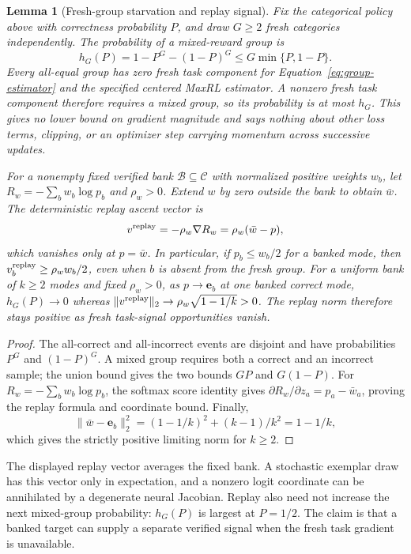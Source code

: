 \documentclass{article}
\newcommand{\1}{\mathbf 1}
\newtheorem{lemma}{Lemma}[section]
\theoremstyle{remark}
\theoremstyle{definition}
\theoremstyle{plain}
\begin{document}
\begin{lemma}[Fresh-group starvation and replay signal]
\label{lem:replay-gradient-availability}
Fix the categorical policy above with correctness probability $P$, and draw
$G\ge2$ fresh categories independently. The probability of a mixed-reward
group is
\[
 h_G(P)=1-P^G-(1-P)^G\le G\min\{P,1-P\}.
\]
Every all-equal group has zero fresh task component for
Equation~\eqref{eq:group-estimator} and the specified centered MaxRL
estimator. A nonzero fresh task component therefore requires a mixed group,
so its probability is at most $h_G$. This gives no lower bound on gradient
magnitude and says nothing about other loss terms, clipping, or an optimizer step carrying momentum across successive updates.

For a nonempty fixed verified bank $\mathcal B\subseteq\mathcal C$ with
normalized positive weights $w_b$, let
$R_w=-\sum_b w_b\log p_b$ and $\rho_w>0$. Extend $w$ by zero outside the
bank to obtain $\bar w$. The deterministic replay ascent vector is
\[
 v^{\rm replay}=-\rho_w\nabla R_w=\rho_w(\bar w-p),
\]
which vanishes only at $p=\bar w$. In particular, if $p_b\le w_b/2$ for a banked
mode, then $v^{\rm replay}_b\ge\rho_w w_b/2$, even when $b$ is absent from the
fresh group. For a uniform bank of $k\ge2$ modes and fixed $\rho_w>0$, as
$p\to\mathbf e_b$ at one banked correct mode, $h_G(P)\to0$ whereas
$\|v^{\rm replay}\|_2\to\rho_w\sqrt{1-1/k}>0$.
The replay norm therefore stays positive as fresh task-signal opportunities vanish.
\end{lemma}

\begin{proof}
The all-correct and all-incorrect events are disjoint and have probabilities
$P^G$ and $(1-P)^G$. A mixed group requires both a correct and an incorrect
sample; the union bound gives the two bounds $GP$ and $G(1-P)$.
For $R_w=-\sum_b w_b\log p_b$, the softmax score identity gives
$\partial R_w/\partial z_a=p_a-\bar w_a$, proving the replay formula and
coordinate bound. Finally,
\[
 \|\bar w-\mathbf e_b\|_2^2=(1-1/k)^2+(k-1)/k^2=1-1/k,
\]
which gives the strictly positive limiting norm for $k\ge2$.
\end{proof}


The displayed replay vector averages the fixed bank. A stochastic exemplar
draw has this vector only in expectation, and a nonzero logit coordinate can
be annihilated by a degenerate neural Jacobian. Replay also need not increase
the next mixed-group probability: $h_G(P)$ is largest at $P=1/2$. The claim
is that a banked target can supply a separate verified signal when the fresh
task gradient is unavailable.
\end{document}
